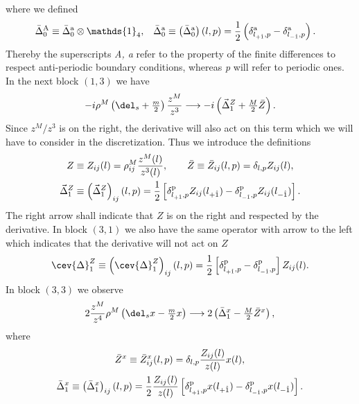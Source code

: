 %
%
where we defined
%
%
\begin{align}
\bar{\Delta}^{\rm A}_{0} &\equiv \bar{\Delta}^{\rm a}_{0} \otimes \mathds{1}_{4}, &
\bar{\Delta}^{\rm a}_{0} &\equiv \left(\bar{\Delta}^{\rm a}_{0}\right)(l,p) = \frac{1}{2}\left( \delta_{l_{+\hat{1}},p}^{\rm a}-\delta_{l_{-\hat{1}},p}^{\rm a}\right).
\end{align}
%
%
Thereby the superscripts \textit{A, a} refer to the property of the finite differences to respect anti-periodic boundary conditions, whereas \textit{p} will refer to periodic ones. In the next block $(1,3)$ we have
%
%
\begin{equation}
-i \rho^{M}\left(\del_{s} +\tfrac{m}{2}\right) \frac{z^{M}}{z^{3}} \longrightarrow -i \left( \vec{\Delta}_{1}^{Z} +\tfrac{M}{2} \bar{Z}\right).
\end{equation}
%
%
Since $z^{M}/z^{3}$ is on the right, the derivative will also act on this term which we will have to consider in the discretization. Thus we introduce the definitions
%
%
\begin{gather}
Z \equiv Z_{ij}(l) = \rho_{ij}^{M} \frac{z^{M}(l)}{z^{3}(l)}, \qquad \bar{Z} \equiv \bar{Z}_{ij}(l,p) = \delta_{l,p} Z_{ij}(l), \\
\vec{\Delta}_{1}^{Z} \equiv \left(\vec{\Delta}_{1}^{Z}\right)_{ij}(l,p) = \frac{1}{2} \left[ \delta_{l_{+\hat{1}},p}^{\rm p}Z_{ij}(l_{+\hat{1}})-\delta_{l_{-\hat{1}},p}^{\rm p} Z_{ij}(l_{-\hat{1}})\right].
\end{gather}
%
%
The right arrow shall indicate that $Z$ is on the right and respected by the derivative. In block $(3,1)$ we also have the same operator with arrow to the left which indicates that the derivative will not act on $Z$
%
%
\begin{equation}
\cev{\Delta}_{1}^{Z} \equiv \left(\cev{\Delta}_{1}^{Z}\right)_{ij}(l,p) = \frac{1}{2} \left[ \delta_{l_{+\hat{1}},p}^{\rm p}-\delta_{l_{-\hat{1}},p}^{\rm p}\right] Z_{ij}(l) .
\end{equation}
%
%
In block $(3,3)$ we observe
%
%
\begin{equation}
2\frac{z^{M}}{z^{4}}\rho^{M}\left(\del_{s}x-\tfrac{m}{2}x\right) \longrightarrow  2\left( \bar{\Delta}_{1}^{x}-\tfrac{M}{2}\bar{Z}^{x} \right),
\end{equation}
%
%
where
%
%
\begin{gather}
\bar{Z}^{x} \equiv \bar{Z}^{x}_{ij}(l,p) = \delta_{l,p}\frac{Z_{ij}(l)}{z(l)}x(l), \\
\bar{\Delta}_{1}^{x} \equiv \left(\bar{\Delta}_{1}^{x}\right)_{ij}(l,p) = \frac{1}{2} \frac{Z_{ij}(l)}{z(l)} \left[ \delta_{l_{+\hat{1}},p}^{\rm p}x(l_{+\hat{1}})-\delta_{l_{-\hat{1}},p}^{\rm p} x(l_{-\hat{1}})\right].
\end{gather}
